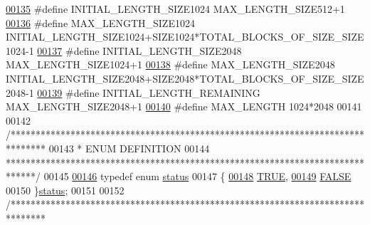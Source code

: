 \begin{DoxyCode}
{\hypertarget{memory_management_8h_source_l00135}{}\hyperlink{memory_management_8h_a6a01fe111aff09aaf870f1f5eb7188f4}{00135} \textcolor{preprocessor}{#define INITIAL\_LENGTH\_SIZE1024           MAX\_LENGTH\_SIZE512+1}
\hypertarget{memory_management_8h_source_l00136}{}\hyperlink{memory_management_8h_a31a9021f5d3473e2c0f34758cce8c1c4}{00136} \textcolor{preprocessor}{#define MAX\_LENGTH\_SIZE1024               INITIAL\_LENGTH\_SIZE1024+SIZE1024*TOTAL\_BLOCKS\_OF\_SIZE\_SIZE1024-1}
\hypertarget{memory_management_8h_source_l00137}{}\hyperlink{memory_management_8h_aa9fb14eb11923e5cef3b2f09f4b9a30f}{00137} \textcolor{preprocessor}{#define INITIAL\_LENGTH\_SIZE2048           MAX\_LENGTH\_SIZE1024+1}
\hypertarget{memory_management_8h_source_l00138}{}\hyperlink{memory_management_8h_ad1a88036d0e1dbeb28757b82db95603f}{00138} \textcolor{preprocessor}{#define MAX\_LENGTH\_SIZE2048               INITIAL\_LENGTH\_SIZE2048+SIZE2048*TOTAL\_BLOCKS\_OF\_SIZE\_SIZE2048-1}
\hypertarget{memory_management_8h_source_l00139}{}\hyperlink{memory_management_8h_a3e3ef8f36911534b592dfb0bcfac2aab}{00139} \textcolor{preprocessor}{#define INITIAL\_LENGTH\_REMAINING          MAX\_LENGTH\_SIZE2048+1}
\hypertarget{memory_management_8h_source_l00140}{}\hyperlink{memory_management_8h_a7a9a231e30b47bc0345749c8bd1e5077}{00140} \textcolor{preprocessor}{#define MAX\_LENGTH                        1024*2048}
00141 
00142 \textcolor{comment}{/*******************************************************************************}
00143 \textcolor{comment}{ * ENUM DEFINITION}
00144 \textcolor{comment}{ ******************************************************************************/}
00145 
\hypertarget{memory_management_8h_source_l00146}{}\hyperlink{memory_management_8h_a015eb90e0de9f16e87bd149d4b9ce959}{00146} \textcolor{keyword}{typedef} \textcolor{keyword}{enum} \hyperlink{memory_management_8h_a015eb90e0de9f16e87bd149d4b9ce959}{status}
00147 \{
\hypertarget{memory_management_8h_source_l00148}{}\hyperlink{memory_management_8h_a015eb90e0de9f16e87bd149d4b9ce959aa82764c3079aea4e60c80e45befbb839}{00148} \hyperlink{memory_management_8h_a015eb90e0de9f16e87bd149d4b9ce959aa82764c3079aea4e60c80e45befbb839}{TRUE},
\hypertarget{memory_management_8h_source_l00149}{}\hyperlink{memory_management_8h_a015eb90e0de9f16e87bd149d4b9ce959aa1e095cc966dbecf6a0d8aad75348d1a}{00149} \hyperlink{memory_management_8h_a015eb90e0de9f16e87bd149d4b9ce959aa1e095cc966dbecf6a0d8aad75348d1a}{FALSE}
00150 \}\hyperlink{memory_management_8h_a015eb90e0de9f16e87bd149d4b9ce959}{status};
00151 
00152 \textcolor{comment}{/*******************************************************************************}
}
\end{DoxyCode}
